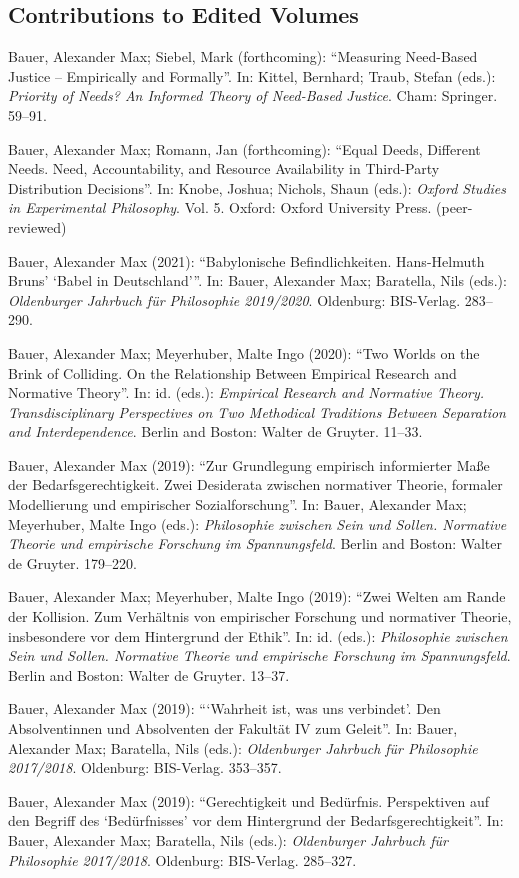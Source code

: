 \documentclass[a4paper,10pt]{article}
\newenvironment{literature}{%
   \parskip6pt\parindent0pt\raggedright
   \def\lititem{\hangindent=1cm\hangafter1}}{%
   \par\ignorespaces}
\begin{document}
\subsection*{Contributions to Edited Volumes}
\begin{literature}
\lititem Bauer, Alexander Max; Siebel, Mark (forthcoming): \enquote{Measuring Need-Based Justice -- Empirically and Formally}. In: Kittel, Bernhard; Traub, Stefan (eds.): \textit{Priority of Needs? An Informed Theory of Need-Based Justice}. Cham: Springer. 59–91.

\lititem Bauer, Alexander Max; Romann, Jan (forthcoming): \enquote{Equal Deeds, Different Needs. Need, Accountability, and Resource Availability in Third-Party Distribution Decisions}. In: Knobe, Joshua; Nichols, Shaun (eds.): \textit{Oxford Studies in Experimental Philosophy}. Vol. 5. Oxford: Oxford University Press. (peer-reviewed)

\lititem Bauer, Alexander Max (2021): \enquote{Babylonische Befindlichkeiten. Hans-Helmuth Bruns' \enquote{Babel in Deutschland}}. In: Bauer, Alexander Max; Baratella, Nils (eds.): \textit{Oldenburger Jahrbuch für Philosophie 2019/2020}. Oldenburg: BIS-Verlag. 283--290.

\lititem Bauer, Alexander Max; Meyerhuber, Malte Ingo (2020): \enquote{Two Worlds on the Brink of Colliding. On the Relationship Between Empirical Research and Normative Theory}. In: id. (eds.): \textit{Empirical Research and Normative Theory. Transdisciplinary Perspectives on Two Methodical Traditions Between Separation and Interdependence}. Berlin and Boston: Walter de Gruyter. 11--33.

\lititem Bauer, Alexander Max (2019): \enquote{Zur Grundlegung empirisch informierter Maße der Bedarfsgerechtigkeit. Zwei Desiderata zwischen normativer Theorie, formaler Modellierung und empirischer Sozialforschung}. In: Bauer, Alexander Max; Meyerhuber, Malte Ingo (eds.): \textit{Philosophie zwischen Sein und Sollen. Normative Theorie und empirische Forschung im Spannungsfeld}. Berlin and Boston: Walter de Gruyter. 179--220.

\lititem Bauer, Alexander Max; Meyerhuber, Malte Ingo (2019): \enquote{Zwei Welten am Rande der Kollision. Zum Verhältnis von empirischer Forschung und normativer Theorie, insbesondere vor dem Hintergrund der Ethik}. In: id. (eds.): \textit{Philosophie zwischen Sein und Sollen. Normative Theorie und empirische Forschung im Spannungsfeld}. Berlin and Boston: Walter de Gruyter. 13--37.

\lititem Bauer, Alexander Max (2019): \enquote{\enquote{Wahrheit ist, was uns verbindet}. Den Absolventinnen und Absolventen der Fakultät IV zum Geleit}. In: Bauer, Alexander Max; Baratella, Nils (eds.): \textit{Oldenburger Jahrbuch für Philosophie 2017/2018}. Oldenburg: BIS-Verlag. 353--357.

\lititem Bauer, Alexander Max (2019): \enquote{Gerechtigkeit und Bedürfnis. Perspektiven auf den Begriff des \enquote{Bedürfnisses} vor dem Hintergrund der Bedarfsgerechtigkeit}. In: Bauer, Alexander Max; Baratella, Nils (eds.): \textit{Oldenburger Jahrbuch für Philosophie 2017/2018}. Oldenburg: BIS-Verlag. 285--327.
\end{literature}
\end{document}
